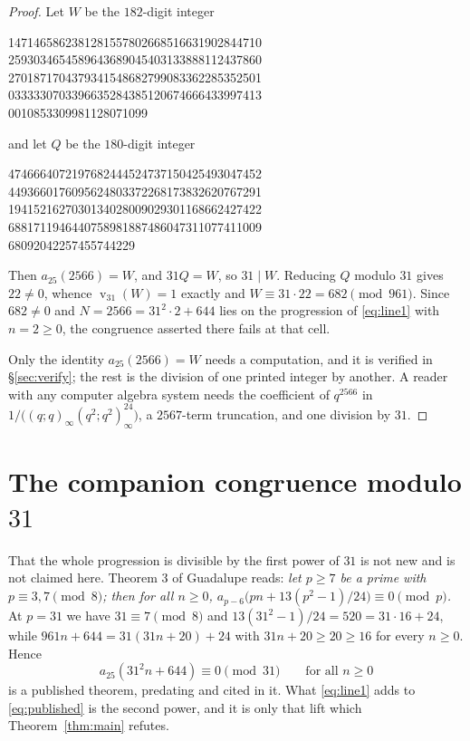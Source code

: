 \documentclass[11pt]{amsart}
\theoremstyle{remark}
\DeclareMathOperator{\vv}{v}
\begin{document}
\begin{proof}
Let $W$ be the $182$-digit integer
\begin{center}\ttfamily\footnotesize
1471465862381281557802668516631902844710 \\
2593034654589643689045403133888112437860 \\
2701871704379341548682799083362285352501 \\
0333330703396635284385120674666433997413 \\
0010853309981128071099
\end{center}
and let $Q$ be the $180$-digit integer
\begin{center}\ttfamily\footnotesize
4746664072197682444524737150425493047452 \\
4493660176095624803372268173832620767291 \\
1941521627030134028009029301168662427422 \\
6881711946440758981887486047311077411009 \\
68092042257455744229
\end{center}
Then $a_{25}(2566)=W$, and $31Q=W$, so $31\mid W$. Reducing $Q$ modulo $31$
gives $22\ne0$, whence $\vv_{31}(W)=1$ exactly and
$W\equiv 31\cdot 22=682\pmod{961}$. Since $682\ne0$ and
$N=2566=31^2\cdot2+644$ lies on the progression of \eqref{eq:line1} with
$n=2\ge0$, the congruence asserted there fails at that cell.

Only the identity $a_{25}(2566)=W$ needs a computation, and it is verified in
\S\ref{sec:verify}; the rest is the division of one printed integer by another.
A reader with any computer algebra system needs the coefficient of $q^{2566}$ in
$1/\bigl((q;q)_\infty(q^2;q^2)_\infty^{24}\bigr)$, a $2567$-term truncation, and
one division by $31$.
\end{proof}

\section{The companion congruence modulo $31$}\label{sec:why}

That the whole progression is divisible by the first power of $31$ is not new
and is not claimed here. Theorem 3 of Guadalupe \cite{Guadalupe} reads: \emph{let
$p\ge7$ be a prime with $p\equiv3,7\pmod 8$; then for all $n\ge0$,
$a_{p-6}\bigl(pn+13(p^2-1)/24\bigr)\equiv0\pmod p$.} At $p=31$ we have
$31\equiv7\pmod 8$ and $13(31^2-1)/24=520=31\cdot16+24$, while
$961n+644=31(31n+20)+24$ with $31n+20\ge20\ge16$ for every $n\ge0$. Hence
\begin{equation}\label{eq:published}
  a_{25}(31^2n+644)\equiv0 \pmod{31}\qquad\text{for all }n\ge0
\end{equation}
is a published theorem, predating \cite{DasMaitySaikia} and cited in it. What
\eqref{eq:line1} adds to \eqref{eq:published} is the second power, and it is
only that lift which Theorem~\ref{thm:main} refutes.
\end{document}
